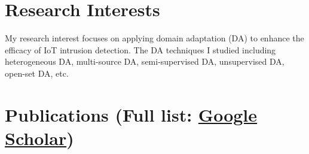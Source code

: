 \documentclass[letterpaper,11pt]{article}
\begin{document}
\vspace{1pt}

\section{Research Interests}

My research interest focuses on applying domain adaptation (DA) to enhance the efficacy of IoT intrusion detection. The DA techniques I studied including heterogeneous DA, multi-source DA, semi-supervised DA, unsupervised DA, open-set DA, etc. 

\vspace{1pt}

\section{Publications (Full list: \href{https://scholar.google.com/citations?user=wGgUbQkAAAAJ}{Google Scholar})}
\end{document}
